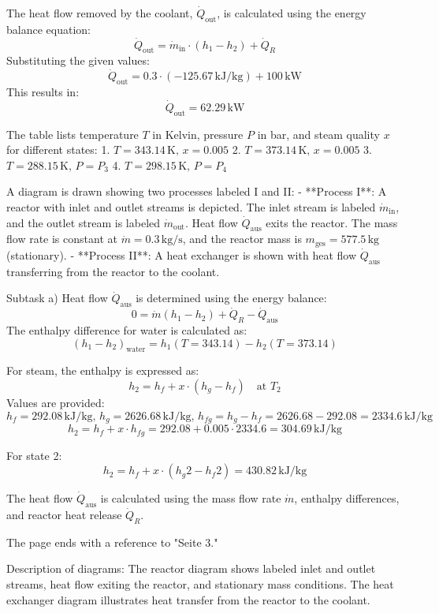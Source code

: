 The heat flow removed by the coolant, \( \dot{Q}_{\text{out}} \), is calculated using the energy balance equation:  
\[
\dot{Q}_{\text{out}} = \dot{m}_{\text{in}} \cdot (h_1 - h_2) + \dot{Q}_R
\]  
Substituting the given values:  
\[
\dot{Q}_{\text{out}} = 0.3 \cdot (-125.67 \, \text{kJ/kg}) + 100 \, \text{kW}
\]  
This results in:  
\[
\dot{Q}_{\text{out}} = 62.29 \, \text{kW}
\]

The table lists temperature \( T \) in Kelvin, pressure \( P \) in bar, and steam quality \( x \) for different states:  
1. \( T = 343.14 \, \text{K}, \, x = 0.005 \)  
2. \( T = 373.14 \, \text{K}, \, x = 0.005 \)  
3. \( T = 288.15 \, \text{K}, \, P = P_3 \)  
4. \( T = 298.15 \, \text{K}, \, P = P_4 \)  

A diagram is drawn showing two processes labeled I and II:  
- **Process I**: A reactor with inlet and outlet streams is depicted. The inlet stream is labeled \( \dot{m}_{\text{in}} \), and the outlet stream is labeled \( \dot{m}_{\text{out}} \). Heat flow \( \dot{Q}_{\text{aus}} \) exits the reactor. The mass flow rate is constant at \( \dot{m} = 0.3 \, \text{kg/s} \), and the reactor mass is \( m_{\text{ges}} = 577.5 \, \text{kg} \) (stationary).  
- **Process II**: A heat exchanger is shown with heat flow \( \dot{Q}_{\text{aus}} \) transferring from the reactor to the coolant.  

Subtask a) Heat flow \( \dot{Q}_{\text{aus}} \) is determined using the energy balance:  
\[
0 = \dot{m} (h_1 - h_2) + \dot{Q}_R - \dot{Q}_{\text{aus}}
\]  
The enthalpy difference for water is calculated as:  
\[
(h_1 - h_2)_{\text{water}} = h_1(T = 343.14) - h_2(T = 373.14)
\]  

For steam, the enthalpy is expressed as:  
\[
h_2 = h_f + x \cdot (h_g - h_f) \quad \text{at } T_2
\]  
Values are provided:  
\[
h_f = 292.08 \, \text{kJ/kg}, \, h_g = 2626.68 \, \text{kJ/kg}, \, h_{fg} = h_g - h_f = 2626.68 - 292.08 = 2334.6 \, \text{kJ/kg}
\]  
\[
h_2 = h_f + x \cdot h_{fg} = 292.08 + 0.005 \cdot 2334.6 = 304.69 \, \text{kJ/kg}
\]  

For state 2:  
\[
h_2 = h_f + x \cdot (h_g2 - h_f2) = 430.82 \, \text{kJ/kg}
\]  

The heat flow \( \dot{Q}_{\text{aus}} \) is calculated using the mass flow rate \( \dot{m} \), enthalpy differences, and reactor heat release \( \dot{Q}_R \).  

The page ends with a reference to "Seite 3."  

Description of diagrams:  
The reactor diagram shows labeled inlet and outlet streams, heat flow exiting the reactor, and stationary mass conditions. The heat exchanger diagram illustrates heat transfer from the reactor to the coolant.